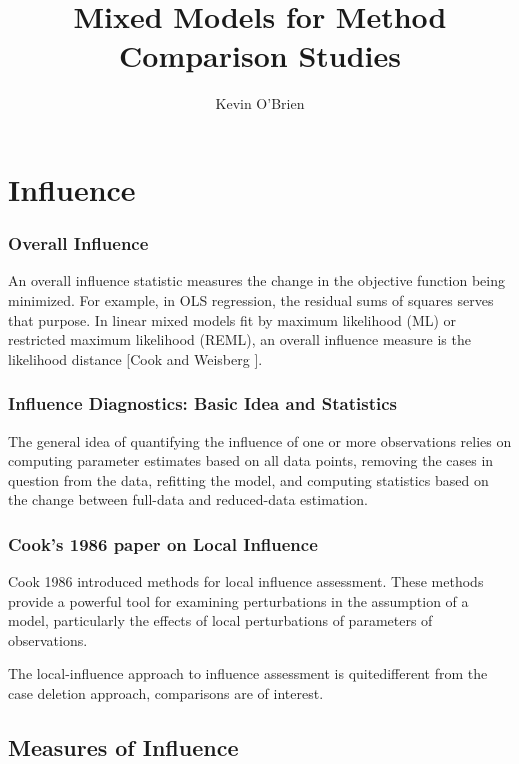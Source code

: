 \documentclass[12pt, a4paper]{article}
\begin{document}
	\author{Kevin O'Brien}
	\title{Mixed Models for Method Comparison Studies}
	\tableofcontents
\chapter{Influence}
	
	
	\subsection{Overall Influence}
	An overall influence statistic measures the change in the objective function being minimized. For example, in
	OLS regression, the residual sums of squares serves that purpose. In linear mixed models fit by
	 maximum likelihood (ML) or  restricted maximum likelihood (REML), an overall influence measure is the  likelihood distance [Cook and Weisberg ].
	
	
	\subsection{Influence Diagnostics: Basic Idea and Statistics} %
	
	The general idea of quantifying the influence of one or more observations relies on computing parameter estimates based on all data points, removing the cases in question from the data, refitting the model, and computing statistics based on the change between full-data and reduced-data estimation. 
	
	
	\subsection{Cook's 1986 paper on Local Influence}%
	Cook 1986 introduced methods for local influence assessment. These methods provide a powerful tool for examining perturbations in the assumption of a model, particularly the effects of local perturbations of parameters of observations.
	
	The local-influence approach to influence assessment is quitedifferent from the case deletion approach, comparisons are of
	interest.
	
	
	
	\section{Measures of Influence} %
	
\end{document}
